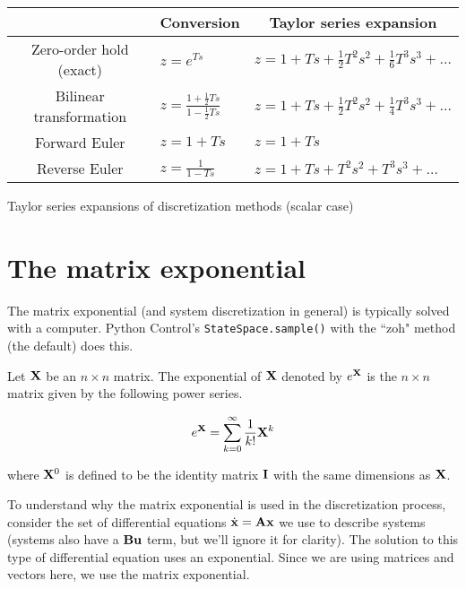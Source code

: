 \begin{booktable}
  \begin{tabular}{|cll|}
    \hline
    \rowcolor{headingbg}
    \multicolumn{1}{|c}{\textbf{Discretization method}} &
      \multicolumn{1}{c}{\textbf{Conversion}} &
      \multicolumn{1}{c|}{\textbf{Taylor series expansion}} \\
    \hline
    Zero-order hold (exact) &
      $z = e^{Ts}$ &
      $z = 1 + Ts + \frac{1}{2}T^2s^2 + \frac{1}{6}T^3s^3 + \ldots$ \\
    Bilinear transformation &
      $z = \frac{1 + \frac{1}{2}Ts}{1 - \frac{1}{2}Ts}$ &
      $z = 1 + Ts + \frac{1}{2}T^2s^2 + \frac{1}{4}T^3s^3 + \ldots$ \\
    Forward Euler &
      $z = 1 + Ts$ &
      $z = 1 + Ts$ \\
    Reverse Euler &
      $z = \frac{1}{1 - Ts}$ &
      $z = 1 + Ts + T^2s^2 + T^3s^3 + \ldots$ \\
    \hline
  \end{tabular}
  \caption{Taylor series expansions of discretization methods (scalar case)}
  \label{tab:disc_approx_scalar}
\end{booktable}

\section{The matrix exponential}

The matrix exponential (and system discretization in general) is typically
solved with a computer. Python Control's \texttt{StateSpace.sample()} with the
``zoh" method (the default) does this.

\begin{definition}
  Let $\mathbf{X}$ be an $n \times n$ matrix. The exponential of $\mathbf{X}$ denoted
  by $e^{\mathbf{X}}$ is the $n \times n$ matrix given by the following power
  series.

  \begin{equation}
    e^{\mathbf{X}} = \sum_{k=0}^\infty \frac{1}{k!} \mathbf{X}^k \label{eq:mat_exp}
  \end{equation}

  where $\mathbf{X}^0$ is defined to be the identity matrix $\mathbf{I}$ with the same
  dimensions as $\mathbf{X}$.
\end{definition}

To understand why the matrix exponential is used in the discretization process,
consider the set of differential equations $\dot{\mathbf{x}} = \mathbf{A}\mathbf{x}$ we
use to describe systems (systems also have a $\mathbf{B}\mathbf{u}$ term, but we'll
ignore it for clarity). The solution to this type of differential equation uses
an exponential. Since we are using matrices and vectors here, we use the matrix
exponential.

